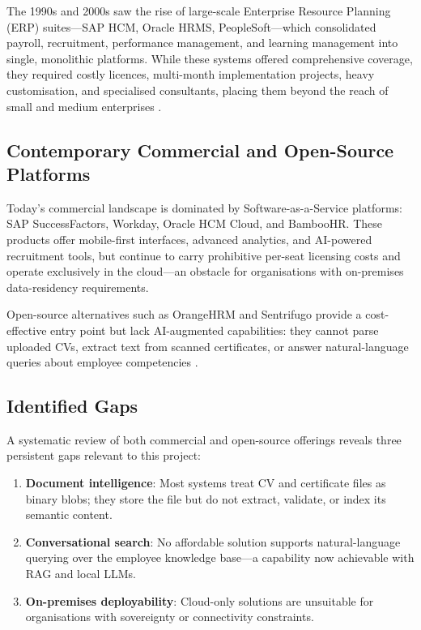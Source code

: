 \documentclass[12pt,a4paper,oneside,openany]{report}
\begin{document}
The 1990s and 2000s saw the rise of large-scale Enterprise Resource Planning (ERP) suites---SAP HCM, Oracle HRMS, PeopleSoft---which consolidated payroll, recruitment, performance management, and learning management into single, monolithic platforms. While these systems offered comprehensive coverage, they required costly licences, multi-month implementation projects, heavy customisation, and specialised consultants, placing them beyond the reach of small and medium enterprises \cite{dinger2017open}.

\subsection{Contemporary Commercial and Open-Source Platforms}
Today's commercial landscape is dominated by Software-as-a-Service platforms: SAP SuccessFactors, Workday, Oracle HCM Cloud, and BambooHR. These products offer mobile-first interfaces, advanced analytics, and AI-powered recruitment tools, but continue to carry prohibitive per-seat licensing costs and operate exclusively in the cloud---an obstacle for organisations with on-premises data-residency requirements.

Open-source alternatives such as OrangeHRM and Sentrifugo provide a cost-effective entry point but lack AI-augmented capabilities: they cannot parse uploaded \acp{CV}, extract text from scanned certificates, or answer natural-language queries about employee competencies \cite{dinger2017open}.

\subsection{Identified Gaps}
A systematic review of both commercial and open-source offerings reveals three persistent gaps relevant to this project:
\begin{enumerate}
  \item \textbf{Document intelligence}: Most systems treat \ac{CV} and certificate files as binary blobs; they store the file but do not extract, validate, or index its semantic content.
  \item \textbf{Conversational search}: No affordable solution supports natural-language querying over the employee knowledge base---a capability now achievable with \ac{RAG} and local \acp{LLM}.
  \item \textbf{On-premises deployability}: Cloud-only solutions are unsuitable for organisations with sovereignty or connectivity constraints.
\end{enumerate}
\end{document}
